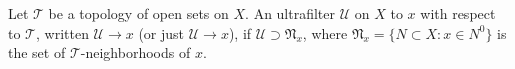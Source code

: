 Let $\mathcal{T}$ be a topology of open sets on $X$. An ultrafilter $\mathcal{U}$ on $X$  to $x$ with respect to $\mathcal{T}$, written $\mathcal{U} \longrightarrow x$ (or just $\mathcal{U} \longrightarrow x$), if $\mathcal{U} \supset \mathfrak{N}_x$, where $\mathfrak{N}_x = \{N \subset X : x \in N^0\}$ is the set of $\mathcal{T}$-neighborhoods of $x$.
